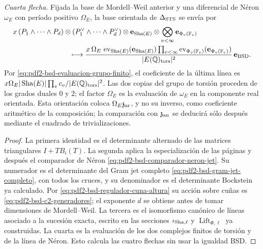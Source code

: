 \begin{proposition}
\emph{Cuarta flecha.} Fijada la base de Mordell--Weil anterior y una
diferencial de Néron $\omega_E$ con período positivo
$\Omega_E$, la base orientada de $\Delta_{\rm STS}$ se envía por
\begin{equation}\label{eq:pdf2-bsd-c4-generadores}
 \begin{aligned}
 &x\,(P_1\wedge\cdots\wedge P_d)\otimes
 (P_1^\vee\wedge\cdots\wedge P_d^\vee)\otimes
 \mathbf e_{\operatorname{Sha}(E)}
 \otimes\bigotimes_{v<\infty}\mathbf e_{\Phi_v(\mathbb F_v)}\\
 &\hspace{28mm}\longmapsto
 \frac{x\,\Omega_E\,
   \operatorname{ev}_{\operatorname{Sha}(E)}
      (\mathbf e_{\operatorname{Sha}(E)})
   \prod_{v<\infty}\operatorname{ev}_{\Phi_v(\mathbb F_v)}
      (\mathbf e_{\Phi_v(\mathbb F_v)})}
 {|E(\mathbb Q)_{\rm tors}|^2}\,
 \mathbf e_{\rm BSD}.
\end{aligned}
\end{equation}
Por \eqref{eq:pdf2-bsd-evaluacion-grupo-finito}, el coeficiente de la última
línea es
$x\Omega_E|\operatorname{Sha}(E)|\prod_vc_v/
|E(\mathbb Q)_{\rm tors}|^2$.
Las dos copias del grupo de torsión proceden de los grados duales $0$ y $2$;
el factor $\Omega_E$ es la evaluación de $\omega_E$ en la componente real
orientada. Esta orientación coloca $\Omega_E\mathfrak z_{\rm ar}$, y no su
inverso, como coeficiente aritmético de la composición; la comparación con
$\mathfrak z_{\rm an}$ se deducirá sólo después mediante el cuadrado de
trivializaciones.
\end{proposition}

\begin{proof}
La primera identidad es el determinante alternado de las matrices triangulares
$I+TB_i(T)$. La segunda aplica la especialización de las páginas y después
el comparador de Néron \eqref{eq:pdf2-bsd-comparador-neron-jet}. Su
numerador es el determinante del Gram jet completo
\eqref{eq:pdf2-bsd-gram-jet-completo}, con todos los cruces, y su denominador
es el determinante Bockstein ya calculado. Por
\eqref{eq:pdf2-bsd-regulador-cuna-altura} su acción sobre cuñas es
\eqref{eq:pdf2-bsd-c2-generadores}; el exponente $d$ se obtiene antes de
tomar dimensiones de Mordell--Weil. La tercera es el isomorfismo canónico de líneas asociado a la
sucesión exacta, escrito en las secciones
$\iota_{{\rm Sha},\ell}$ y $\operatorname{Lift}_{\Phi,\ell}$ ya
construidas. La cuarta es la evaluación de los dos complejos finitos de
torsión y de la línea de Néron. Esto calcula las cuatro flechas sin usar la
igualdad BSD.
\end{proof}

